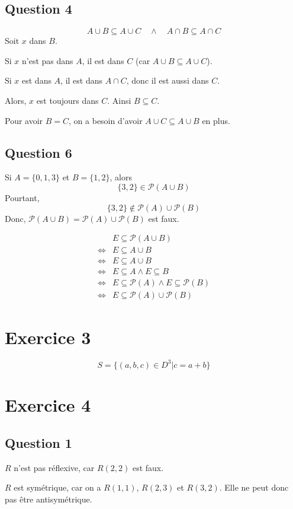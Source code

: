 \documentclass[a4paper]{article}
\begin{document}
    \subsection*{Question 4}
    $$ A\cup B\subseteq A\cup C\quad\land\quad A\cap B\subseteq A\cap C $$
    Soit $x$ dans $B$.

    Si $x$ n'est pas dans $A$, il est dans $C$ (car $A\cup B\subseteq A\cup C$).

    Si $x$ est dans $A$, il est dans $A\cap C$, donc il est aussi dans $C$.

    Alors, $x$ est toujours dans $C$.
    Ainsi $B\subseteq C$.

    Pour avoir $B=C$, on a besoin d'avoir $A\cup C\subseteq A\cup B$ en plus.
    \subsection*{Question 6}
    Si $A=\{0, 1, 3\}$ et $B=\{1, 2\}$, alors
    $$ \{3,2\}\in\mathcal{P}(A\cup B) $$
    Pourtant, $$\{3,2\}\not\in \mathcal{P}(A)\cup\mathcal{P}(B)$$
    Donc, $\mathcal{P}(A\cup B)=\mathcal{P}(A)\cup\mathcal{P}(B)$ est faux.

    \begin{align*}
        & E\subseteq \mathcal{P}(A\cup B) \\
        \iff & E\subseteq A\cup B \\
        \iff & E\subseteq A\cup B \\
        \iff & E\subseteq A \land E\subseteq B \\
        \iff & E\subseteq \mathcal{P}(A) \land E\subseteq \mathcal{P}(B) \\
        \iff & E\subseteq \mathcal{P}(A)\cup\mathcal{P}(B)
    \end{align*}
    \section*{Exercice 3}
    $$ S = \{(a,b,c)\in D^3|c=a+b\} $$
    \section*{Exercice 4}
    \subsection*{Question 1}
    $R$ n'est pas réflexive, car $R(2,2)$ est faux.

    $R$ est symétrique, car on a $R(1,1)$, $R(2,3)$ et $R(3,2)$.
    Elle ne peut donc pas être antisymétrique.
\end{document}
